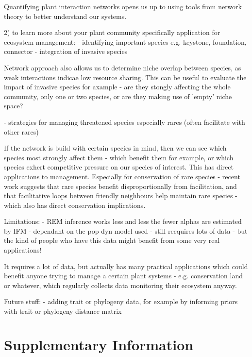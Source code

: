 \documentclass[a4,12pt]{article}
\begin{document}
    Quantifying plant interaction networks opens us up to using tools from network theory to better understand our systems. 



    2) to learn more about your plant community specifically 
    application for ecosystem management: 
    - identifying important species e.g. keystone, foundation, connector
    - integration of invasive species

           Network approach also allows us to determine niche overlap between species, as weak interactions indicae low resource sharing. This can be useful to evaluate the impact of invasive species for axample - are they stongly affecting the whole community, only one or two species, or are they making use of 'empty' niche space? 

    - strategies for managing threatened species especially rares (often facilitate with other rares) 

        If the network is build with certain species in mind, then we can see which species most strongly affect them - which benefit them for example, or which species exhert competitive pressure on our species of interest. This has direct applications to management. Especially for conservation of rare species - recent work suggests that rare species benefit disproportionally from facilitation, and that facilitative loops between friendly neighbours help maintain rare species - which also has direct conservation implications. 


    Limitations: 
    - REM inference works less and less the fewer alphas are estimated by IFM
    - dependant on the pop dyn model used
    - still recquires lots of data - but the kind of people who have this data might benefit from some very real applications!

    It requires a lot of data, but actually has many practical applications which could benefit anyone trying to manage a certain plant systems - e.g. conservation land or whatever, which regularly collects data monitoring their ecosystem anyway. 

    Future stuff: 
    - adding trait or phylogeny data, for example by informing priors with trait or phylogeny distance matrix

    

    \section{Supplementary Information}
\end{document}
